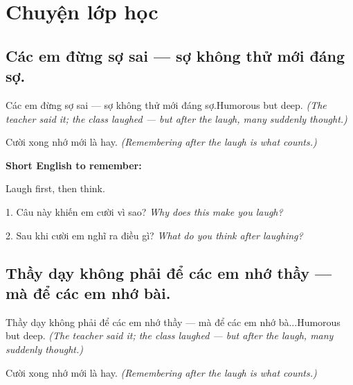 \chapter{Chuyện lớp học}


\section{Các em đừng sợ sai — sợ không thử mới đáng sợ.}
\begin{truyen}{Các em đừng sợ sai — sợ không thử mới đáng sợ.}{Humorous but deep.}
\textit{(The teacher said it; the class laughed — but after the laugh, many suddenly thought.)}
\end{truyen}

\begin{baihoc}
Cười xong nhớ mới là hay.
\textit{(Remembering after the laugh is what counts.)}
\end{baihoc}

\begin{ghinhoanh}
\textbf{Short English to remember:}

Laugh first, then think.

\end{ghinhoanh}

\begin{tuhocnhanh}
1. Câu này khiến em cười vì sao? \textit{Why does this make you laugh?}

2. Sau khi cười em nghĩ ra điều gì? \textit{What do you think after laughing?}
\end{tuhocnhanh}
\ngancach


\section{Thầy dạy không phải để các em nhớ thầy — mà để các em nhớ bài.}
\begin{truyen}{Thầy dạy không phải để các em nhớ thầy — mà để các em nhớ bà...}{Humorous but deep.}
\textit{(The teacher said it; the class laughed — but after the laugh, many suddenly thought.)}
\end{truyen}

\begin{baihoc}
Cười xong nhớ mới là hay.
\textit{(Remembering after the laugh is what counts.)}
\end{baihoc}

